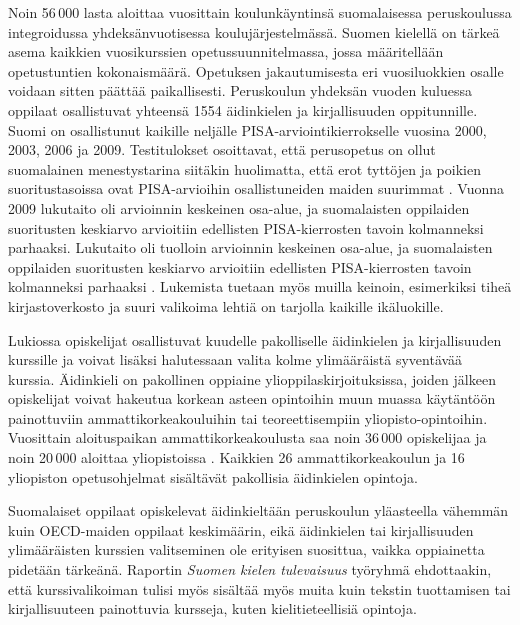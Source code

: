 \begin{multicols}{2}
Noin 56\,000 lasta aloittaa vuosittain koulunkäyntinsä suomalaisessa peruskoulussa integroidussa yhdeksänvuotisessa koulujärjestelmässä. Suomen kielellä on tärkeä asema kaikkien vuosikurssien opetussuunnitelmassa, jossa määritellään opetustuntien kokonaismäärä. Opetuksen jakautumisesta eri vuosiluokkien osalle voidaan sitten päättää paikallisesti. Peruskoulun yhdeksän vuoden kuluessa oppilaat osallistuvat yhteensä 1554 äidinkielen ja kirjallisuuden oppitunnille.    Suomi on osallistunut kaikille neljälle PISA-arviointikierrokselle vuosina 2000, 2003, 2006 ja 2009. Testitulokset osoittavat, että perusopetus on ollut suomalainen menestystarina siitäkin huolimatta, että erot tyttöjen ja poikien suoritustasoissa ovat PISA-arvioihin osallistuneiden maiden suurimmat \cite{Literacy}. Vuonna 2009 lukutaito oli arvioinnin keskeinen osa-alue, ja suomalaisten oppilaiden suoritusten keskiarvo arvioitiin edellisten PISA-kierrosten tavoin kolmanneksi parhaaksi. Lukutaito oli tuolloin arvioinnin keskeinen osa-alue, ja suomalaisten oppilaiden suoritusten keskiarvo arvioitiin edellisten PISA-kierrosten tavoin kolmanneksi parhaaksi \cite{Pisa2006}. Lukemista tuetaan myös muilla keinoin, esimerkiksi tiheä kirjastoverkosto ja suuri valikoima lehtiä on tarjolla kaikille ikäluokille.

Lukiossa opiskelijat osallistuvat kuudelle pakolliselle äidinkielen ja kirjallisuuden kurssille ja voivat lisäksi halutessaan valita kolme ylimääräistä syventävää kurssia. Äidinkieli on pakollinen oppiaine ylioppilaskirjoituksissa, joiden jälkeen opiskelijat voivat hakeutua korkean asteen opintoihin muun muassa käytäntöön painottuviin ammattikorkeakouluihin tai teoreettisempiin yliopisto-opintoihin. Vuosittain aloituspaikan ammattikorkeakoulusta saa noin 36\,000 opiskelijaa ja noin 20\,000 aloittaa yliopistoissa \cite{Education}. Kaikkien 26 ammattikorkeakoulun ja 16 yliopiston opetusohjelmat sisältävät pakollisia äidinkielen opintoja.

Suomalaiset oppilaat opiskelevat äidinkieltään peruskoulun yläasteella vähemmän kuin OECD-maiden oppilaat keskimäärin, eikä äidinkielen tai kirjallisuuden ylimääräisten kurssien valitseminen ole erityisen suosittua, vaikka oppiainetta pidetään tärkeänä. Raportin \textit{Suomen kielen tulevaisuus} \cite{Tulevaisuus2009} työryhmä ehdottaakin, että kurssivalikoiman tulisi myös sisältää myös muita kuin tekstin tuottamisen tai kirjallisuuteen painottuvia kursseja, kuten kielitieteellisiä opintoja.


\end{multicols}
